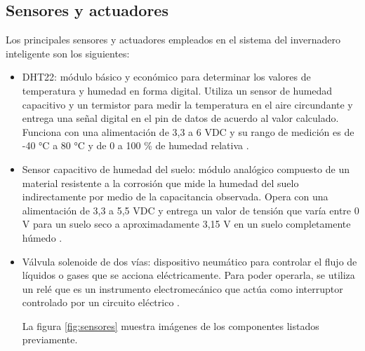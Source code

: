 \subsection{Sensores y actuadores}
\label{sec:Sensores y actuadores}
Los principales sensores y actuadores empleados en el sistema del invernadero inteligente son los siguientes:
\begin{itemize}

\item DHT22: módulo básico y económico para determinar los valores de temperatura y humedad en forma digital. Utiliza un sensor de humedad capacitivo y un termistor para medir la temperatura en el aire circundante y entrega una señal digital en el pin de datos de acuerdo al valor calculado. Funciona con una alimentación de 3,3 a 6 VDC y su rango de medición es de -40 °C a 80 °C y de 0 a 100 \% de humedad relativa \citep{dht22}.

\item Sensor capacitivo de humedad del suelo: módulo analógico compuesto de un material resistente a la corrosión que mide la humedad del suelo indirectamente por medio de la capacitancia observada. Opera con una alimentación de 3,3 a 5,5 VDC y entrega un valor de tensión que varía entre 0 V para un suelo seco a aproximadamente 3,15 V en un suelo completamente húmedo \citep{soilsensor}.

\item Válvula solenoide de dos vías: dispositivo neumático para controlar el flujo de líquidos o gases que se acciona eléctricamente. Para poder operarla, se utiliza un relé que es un instrumento electromecánico que actúa como interruptor controlado por un circuito eléctrico \citep{valve}\citep{rele}.

La figura \ref{fig:sensores} muestra imágenes de los componentes listados previamente.

\end{itemize}
%

